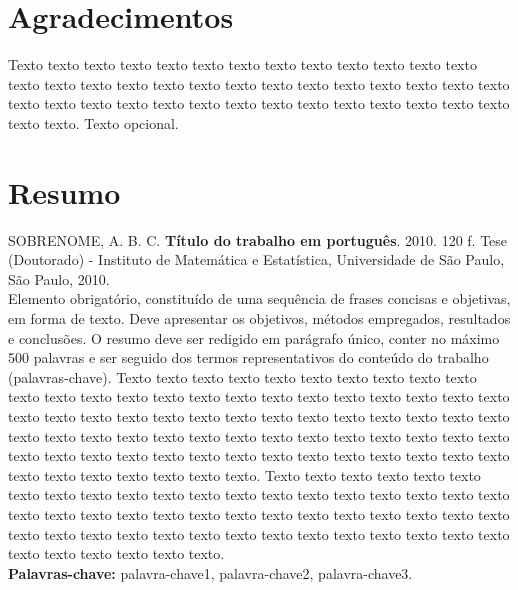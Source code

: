 \documentclass[11pt,twoside,a4paper]{book}
\theoremstyle{note}
\begin{document}

\chapter*{Agradecimentos}
Texto texto texto texto texto texto texto texto texto texto texto texto texto
texto texto texto texto texto texto texto texto texto texto texto texto texto
texto texto texto texto texto texto texto texto texto texto texto texto texto
texto texto texto texto. Texto opcional.


\chapter*{Resumo}

\noindent SOBRENOME, A. B. C. \textbf{Título do trabalho em português}. 
2010. 120 f.
Tese (Doutorado) - Instituto de Matemática e Estatística,
Universidade de São Paulo, São Paulo, 2010.
\\

Elemento obrigatório, constituído de uma sequência de frases concisas e
objetivas, em forma de texto.  Deve apresentar os objetivos, métodos empregados,
resultados e conclusões.  O resumo deve ser redigido em parágrafo único, conter
no máximo 500 palavras e ser seguido dos termos representativos do conteúdo do
trabalho (palavras-chave). 
Texto texto texto texto texto texto texto texto texto texto texto texto texto
texto texto texto texto texto texto texto texto texto texto texto texto texto
texto texto texto texto texto texto texto texto texto texto texto texto texto
texto texto texto texto texto texto texto texto texto texto texto texto texto
texto texto texto texto texto texto texto texto texto texto texto texto texto
texto texto texto texto texto texto texto texto.
Texto texto texto texto texto texto texto texto texto texto texto texto texto
texto texto texto texto texto texto texto texto texto texto texto texto texto
texto texto texto texto texto texto texto texto texto texto texto texto texto
texto texto texto texto texto texto texto texto texto texto texto texto texto
texto texto.
\\

\noindent \textbf{Palavras-chave:} palavra-chave1, palavra-chave2, palavra-chave3.
\end{document}
